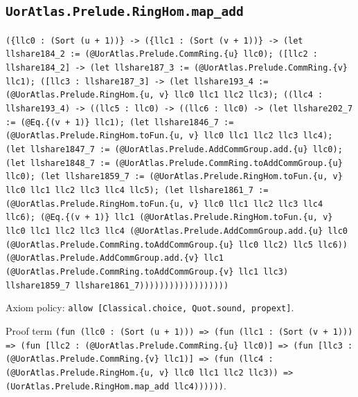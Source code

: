 \documentclass[11pt]{article}
\begin{document}
\subsection*{\texttt{UorAtlas.Prelude.RingHom.map\_add}}
\noindent\texttt{(\{llc0 : (Sort (u + 1))\} -> (\{llc1 : (Sort (v + 1))\} -> (let llshare184\_2 := (@UorAtlas.Prelude.CommRing.\{u\} llc0); ([llc2 : llshare184\_2] -> (let llshare187\_3 := (@UorAtlas.Prelude.CommRing.\{v\} llc1); ([llc3 : llshare187\_3] -> (let llshare193\_4 := (@UorAtlas.Prelude.RingHom.\{u, v\} llc0 llc1 llc2 llc3); ((llc4 : llshare193\_4) -> ((llc5 : llc0) -> ((llc6 : llc0) -> (let llshare202\_7 := (@Eq.\{(v + 1)\} llc1); (let llshare1846\_7 := (@UorAtlas.Prelude.RingHom.toFun.\{u, v\} llc0 llc1 llc2 llc3 llc4); (let llshare1847\_7 := (@UorAtlas.Prelude.AddCommGroup.add.\{u\} llc0); (let llshare1848\_7 := (@UorAtlas.Prelude.CommRing.toAddCommGroup.\{u\} llc0); (let llshare1859\_7 := (@UorAtlas.Prelude.RingHom.toFun.\{u, v\} llc0 llc1 llc2 llc3 llc4 llc5); (let llshare1861\_7 := (@UorAtlas.Prelude.RingHom.toFun.\{u, v\} llc0 llc1 llc2 llc3 llc4 llc6); (@Eq.\{(v + 1)\} llc1 (@UorAtlas.Prelude.RingHom.toFun.\{u, v\} llc0 llc1 llc2 llc3 llc4 (@UorAtlas.Prelude.AddCommGroup.add.\{u\} llc0 (@UorAtlas.Prelude.CommRing.toAddCommGroup.\{u\} llc0 llc2) llc5 llc6)) (@UorAtlas.Prelude.AddCommGroup.add.\{v\} llc1 (@UorAtlas.Prelude.CommRing.toAddCommGroup.\{v\} llc1 llc3) llshare1859\_7 llshare1861\_7))))))))))))))))))}\par
\noindent Axiom policy: \texttt{allow [Classical.choice, Quot.sound, propext]}.\par
\noindent Proof term \texttt{(fun (llc0 : (Sort (u + 1))) => (fun (llc1 : (Sort (v + 1))) => (fun [llc2 : (@UorAtlas.Prelude.CommRing.\{u\} llc0)] => (fun [llc3 : (@UorAtlas.Prelude.CommRing.\{v\} llc1)] => (fun (llc4 : (@UorAtlas.Prelude.RingHom.\{u, v\} llc0 llc1 llc2 llc3)) => (UorAtlas.Prelude.RingHom.map\_add llc4))))))}.\par
\end{document}
